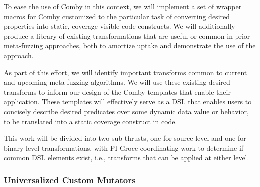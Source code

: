 To ease the use of Comby in this context, we will implement a set of wrapper
macros for Comby customized to the particular task of converting desired
properties into static, coverage-visible code constructs.  We will additionally
produce a library of existing transformations that are useful or common in prior
meta-fuzzing approaches, both to amortize uptake and demonstrate the use of the
approach.  

As part of this effort, we will identify important transforms common to current
and upcoming meta-fuzzing algorithms.  We will use these existing desired
transforms to inform our design of the Comby templates that enable their
application. These templates will effectively serve as a DSL that enables users
to concisely describe desired predicates over some dynamic data value or
behavior, to be translated into a static coverage construct in code. 




This work will be divided into two sub-thrusts, one for source-level and one 
for binary-level transformations, with PI Groce coordinating work to determine 
if common DSL elements exist, i.e., transforms that can be applied at either 
level.


\subsubsection{Universalized Custom Mutators}


